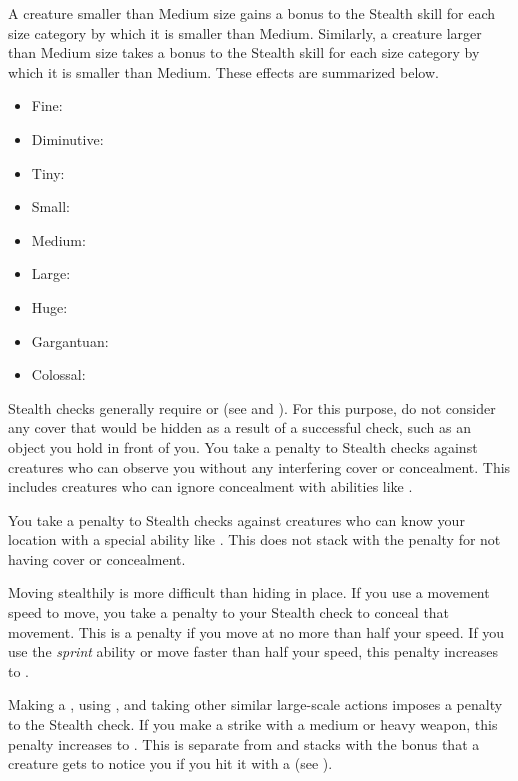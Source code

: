         A creature smaller than Medium size gains a  bonus to the Stealth skill for each size category by which it is smaller than Medium.
        Similarly, a creature larger than Medium size takes a  bonus to the Stealth skill for each size category by which it is smaller than Medium.
        These effects are summarized below.
            \begin{itemize}
                \item Fine: 
                \item Diminutive: 
                \item Tiny: 
                \item Small: 
                \item Medium: 
                \item Large: 
                \item Huge: 
                \item Gargantuan: 
                \item Colossal: 
            \end{itemize}

        Stealth checks generally require  or  (see  and ).
        For this purpose, do not consider any cover that would be hidden as a result of a successful check, such as an object you hold in front of you.
        You take a  penalty to Stealth checks against creatures who can observe you without any interfering cover or concealment.
        This includes creatures who can ignore concealment with abilities like .

        You take a  penalty to Stealth checks against creatures who can know your location with a special ability like .
        This does not stack with the penalty for not having cover or concealment.

        Moving stealthily is more difficult than hiding in place.
        If you use a movement speed to move, you take a penalty to your Stealth check to conceal that movement.
        This is a  penalty if you move at no more than half your speed.
        If you use the \textit{sprint} ability or move faster than half your speed, this penalty increases to .

        Making a , using , and taking other similar large-scale actions imposes a  penalty to the Stealth check.
        If you make a strike with a medium or heavy weapon, this penalty increases to .
        This is separate from and stacks with the  bonus that a creature gets to notice you if you hit it with a  (see ).

